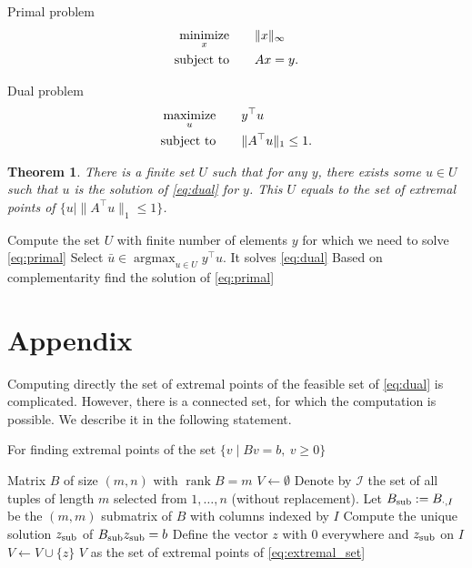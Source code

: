\documentclass{article}
\newcommand{\mnmz}{\operatorname*{minimize}}
\newcommand{\mxmz}{\operatorname*{maximize}}
\newcommand{\st}{\operatorname{subject\ to}}
\newcommand{\norm}[1]{\|#1\|}
\newtheorem{theorem}[thm]{Theorem}
\theoremstyle{definition}
\newcommand{\argmax}{\operatorname{argmax}}
\newcommand{\rank}{\operatorname{rank}}
\begin{document}
Primal problem
\begin{equation}\label{eq:primal}
  \aligned
  \mnmz_x\qquad &\norm{x}_\infty \\
  \st\qquad &Ax=y.
  \endaligned
\end{equation}

Dual problem
\begin{equation}\label{eq:dual}
  \aligned
  \mxmz_u\qquad &y^\top u \\
  \st\qquad &\norm{A^\top u}_1 \le 1.
  \endaligned
\end{equation}

\begin{theorem}
  There is a finite set $U$ such that for any $y$, there exists some $u\in U$ such that $u$ is the solution of \eqref{eq:dual} for $y$. This $U$ equals to the set of extremal points of $\{u\mid \norm{A^\top u}_1\le 1\}$.
\end{theorem}


\begin{algorithm}
\begin{algorithmic}[1]
  \Offline Compute the set $U$ with finite number of elements
  \Require $y$ for which we need to solve \eqref{eq:primal}
  \State Select $\bar u \in \argmax_{u\in U}y^\top u$. It solves \eqref{eq:dual}
  \State Based on complementarity find the solution of \eqref{eq:primal}
\end{algorithmic}
\end{algorithm}


\appendix

\section{Appendix}

Computing directly the set of extremal points of the feasible set of \eqref{eq:dual} is complicated. However, there is a connected set, for which the computation is possible. We describe it in the following statement.



\begin{algorithm}
\caption{For finding extremal points of the set $\{v\mid Bv=b,\ v\ge 0\}$}
\label{alg:extremal}
\begin{algorithmic}[1]
  \Require Matrix $B$ of size $(m,n)$ with $\rank B=m$
  \State $V\gets\emptyset$
  \State Denote by $\mathcal I$ the set of all tuples of length $m$ selected from $1,\dots,n$ (without replacement).
    \State Let $B_{\rm sub} := B_{\cdot,I}$ be the $(m,m)$ submatrix of $B$ with columns indexed by $I$
    \If{$\rank B_{\rm sub} = m$}
      \State Compute the unique solution $z_{\rm sub}$ of $B_{\rm sub}z_{\rm sub} = b$
        \State Define the vector $z$ with $0$ everywhere and $z_{\rm sub}$ on $I$
        \State $V\gets V\cup\{z\}$
      \EndIf              
    \EndIf
  \EndFor
  \Ensure $V$ as the set of extremal points of \eqref{eq:extremal_set}
\end{algorithmic}
\end{algorithm}
\end{document}
